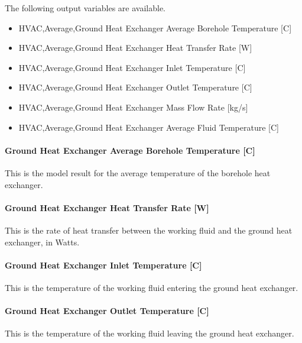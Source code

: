 The following output variables are available.

\begin{itemize}
\item
  HVAC,Average,Ground Heat Exchanger Average Borehole Temperature {[}C{]}
\item
  HVAC,Average,Ground Heat Exchanger Heat Transfer Rate {[}W{]}
\item
  HVAC,Average,Ground Heat Exchanger Inlet Temperature {[}C{]}
\item
  HVAC,Average,Ground Heat Exchanger Outlet Temperature {[}C{]}
\item
  HVAC,Average,Ground Heat Exchanger Mass Flow Rate {[}kg/s{]}
\item
  HVAC,Average,Ground Heat Exchanger Average Fluid Temperature {[}C{]}
\end{itemize}

\paragraph{Ground Heat Exchanger Average Borehole Temperature {[}C{]}}\label{ground-heat-exchanger-average-borehole-temperature-c-1}

This is the model result for the average temperature of the borehole heat exchanger.

\paragraph{Ground Heat Exchanger Heat Transfer Rate {[}W{]}}\label{ground-heat-exchanger-heat-transfer-rate-w-1}

This is the rate of heat transfer between the working fluid and the ground heat exchanger, in Watts.

\paragraph{Ground Heat Exchanger Inlet Temperature {[}C{]}}\label{ground-heat-exchanger-inlet-temperature-c-1}

This is the temperature of the working fluid entering the ground heat exchanger.

\paragraph{Ground Heat Exchanger Outlet Temperature {[}C{]}}\label{ground-heat-exchanger-outlet-temperature-c-1}

This is the temperature of the working fluid leaving the ground heat exchanger.

